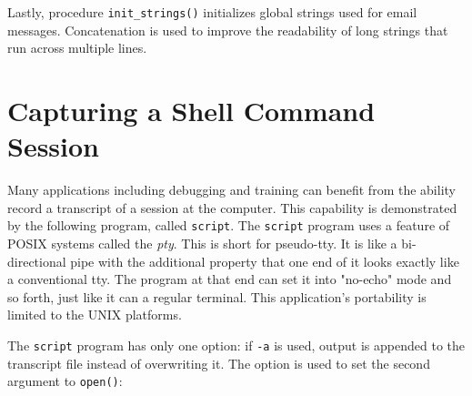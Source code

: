 Lastly, procedure \texttt{init\_strings()} initializes global strings
used for email messages. Concatenation is used to improve the
readability of long strings that run across multiple lines.


\section{Capturing a Shell Command Session}

Many applications including debugging and training can benefit from the
ability record a transcript of a session at the computer. This
capability is demonstrated by the following program, called
\texttt{script}. The \texttt{script} program uses a feature of POSIX
systems called the \textit{pty}. This is short for
pseudo-tty. It is like a bi-directional pipe with the
additional property that one end of it looks exactly like a
conventional tty. The program at that end can set it into
"no-echo" mode and so forth, just like it
can a regular terminal. This application's portability
is limited to the UNIX platforms.

The \texttt{script} program has only one option: if \texttt{{}-a} is
used, output is appended to the transcript file instead of overwriting
it. The option is used to set the second argument to \texttt{open()}:


